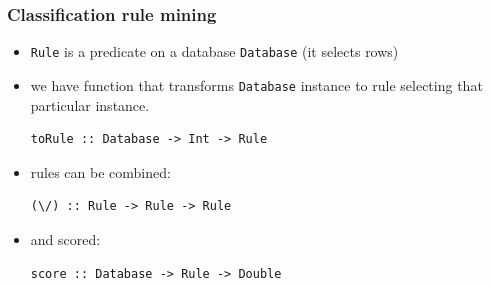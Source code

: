 \documentclass[mathserif, 8pt, handout]{beamer}
\def\fs{\vskip0ex}
\begin{document}
\begin{frame}[fragile]
  \frametitle{Classification rule mining}

  \begin{itemize}
  \item \texttt{Rule}
    is a predicate on a database \texttt{Database} (it selects rows)
    \pause
  \item we have function that transforms \texttt{Database} instance
    to rule selecting that particular instance.
\begin{verbatim}
toRule :: Database -> Int -> Rule
\end{verbatim}
    \pause
  \item rules can be combined:
\begin{verbatim}
(\/) :: Rule -> Rule -> Rule
\end{verbatim}
    \pause
  \item and scored:
\begin{verbatim}
score :: Database -> Rule -> Double
\end{verbatim}
  \end{itemize}

    \pause

\end{frame}
\end{document}
